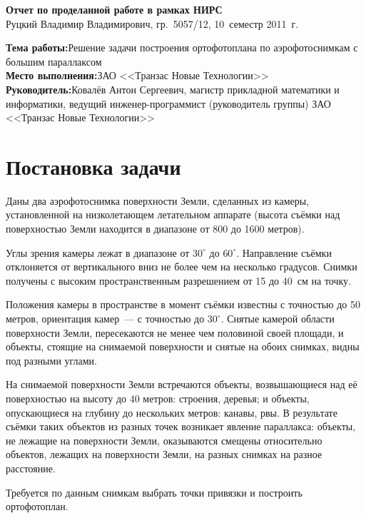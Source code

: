 \documentclass[a4paper,12pt]{article}
\begin{document}

\begin{center}
\begin{spacing}{1.3}
  {\Large\bfseries Отчет по проделанной работе в рамках НИРС} \\
  {\large Руцкий Владимир Владимирович, гр.~5057/12, 10~семестр 2011~г.}
\end{spacing}
\end{center}

\noindent\textbf{Тема работы:}\quad Решение задачи построения ортофотоплана по аэрофотоснимкам с большим параллаксом \\
\textbf{Место выполнения:}\quad ЗАО <<Транзас Новые Технологии>> \\
\textbf{Руководитель:}\quad Ковалёв Антон Сергеевич, 
магистр прикладной математики и информатики, 
ведущий инженер-программист (руководитель группы) ЗАО <<Транзас Новые Технологии>>

\section{Постановка задачи}
Даны два аэрофотоснимка поверхности Земли, сделанных из камеры, установленной на низколетающем летательном аппарате
(высота съёмки над поверхностью Земли находится в диапазоне от 800 до 1600 метров).

Углы зрения камеры лежат в диапазоне от $30^{\circ}$ до $60^{\circ}$.
Направление съёмки отклоняется от вертикального вниз не более чем на несколько градусов.
Снимки получены с высоким пространственным разрешением от 15 до 40~см на точку.

Положения камеры в пространстве в момент съёмки известны с точностью до 50 метров, 
ориентация камер~--- с точностью до $30^{\circ}$.
Снятые камерой области поверхности Земли, пересекаются не менее чем половиной своей площади,
и объекты, стоящие на снимаемой поверхности и снятые на обоих снимках, видны под разными углами.

На снимаемой поверхности Земли встречаются объекты, возвышающиеся над её поверхностью на высоту до 40 метров: 
строения, деревья; 
и объекты, опускающиеся на глубину до нескольких метров: канавы, рвы.
В результате съёмки таких объектов из разных точек возникает явление параллакса:
объекты, не лежащие на поверхности Земли, оказываются смещены относительно объектов, лежащих на поверхности Земли,
на разных снимках на разное расстояние.

Требуется по данным снимкам выбрать точки привязки и построить ортофотоплан.
\end{document}
